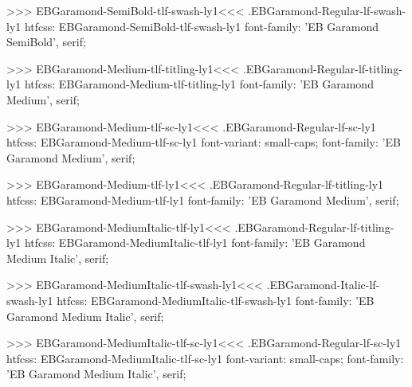 {{>>>
\<EBGaramond-SemiBold-tlf-swash-ly1\><<<
.EBGaramond-Regular-lf-swash-ly1
htfcss:  EBGaramond-SemiBold-tlf-swash-ly1  font-family: 'EB Garamond SemiBold', serif;

>>>
\<EBGaramond-Medium-tlf-titling-ly1\><<<
.EBGaramond-Regular-lf-titling-ly1
htfcss:  EBGaramond-Medium-tlf-titling-ly1  font-family: 'EB Garamond Medium', serif;

>>>
\<EBGaramond-Medium-tlf-sc-ly1\><<<
.EBGaramond-Regular-lf-sc-ly1
htfcss:  EBGaramond-Medium-tlf-sc-ly1  font-variant: small-caps; font-family: 'EB Garamond Medium', serif;

>>>
\<EBGaramond-Medium-tlf-ly1\><<<
.EBGaramond-Regular-lf-titling-ly1
htfcss:  EBGaramond-Medium-tlf-ly1  font-family: 'EB Garamond Medium', serif;

>>>
\<EBGaramond-MediumItalic-tlf-ly1\><<<
.EBGaramond-Regular-lf-titling-ly1
htfcss:  EBGaramond-MediumItalic-tlf-ly1  font-family: 'EB Garamond Medium Italic', serif;

>>>
\<EBGaramond-MediumItalic-tlf-swash-ly1\><<<
.EBGaramond-Italic-lf-swash-ly1
htfcss:  EBGaramond-MediumItalic-tlf-swash-ly1  font-family: 'EB Garamond Medium Italic', serif;

>>>
\<EBGaramond-MediumItalic-tlf-sc-ly1\><<<
.EBGaramond-Regular-lf-sc-ly1
htfcss:  EBGaramond-MediumItalic-tlf-sc-ly1  font-variant: small-caps; font-family: 'EB Garamond Medium Italic', serif;

}}
